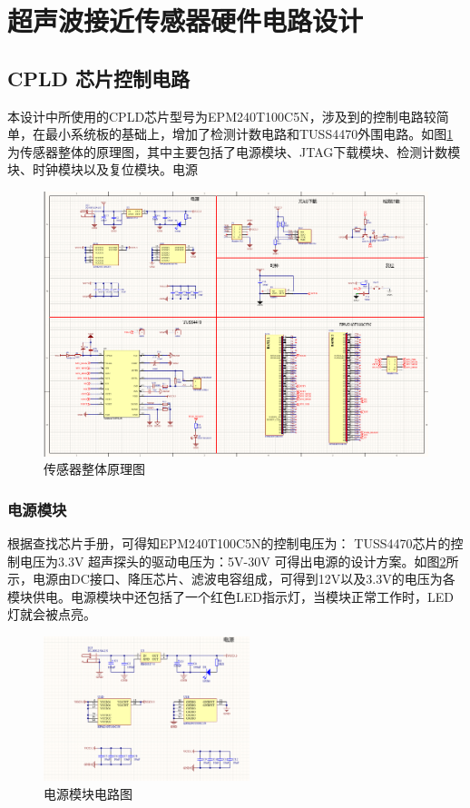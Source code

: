     \newpage
	\section{超声波接近传感器硬件电路设计}
	
    \subsection{CPLD 芯片控制电路}
    本设计中所使用的CPLD芯片型号为EPM240T100C5N，涉及到的控制电路较简单，在最小系统板的基础上，增加了检测计数电路和TUSS4470外围电路。如图\ref{传感器整体原理图}为传感器整体的原理图，其中主要包括了电源模块、JTAG下载模块、检测计数模块、时钟模块以及复位模块。电源
    \begin{figure}[ht]
        \centering
        \includegraphics[width=12cm]{figure/Overall circuit.png}
        \caption{传感器整体原理图}
        \label{传感器整体原理图}
    \end{figure}
    \subsubsection{电源模块}
      根据查找芯片手册，可得知EPM240T100C5N的控制电压为：
    TUSS4470芯片的控制电压为3.3V
    超声探头的驱动电压为：5V-30V
    可得出电源的设计方案。如图\ref{电源模块电路图}所示，电源由DC接口、降压芯片、滤波电容组成，可得到12V以及3.3V的电压为各模块供电。电源模块中还包括了一个红色LED指示灯，当模块正常工作时，LED灯就会被点亮。
    
         \begin{figure}[ht]
        \centering
        \includegraphics[width=6cm]{figure/Power circuit.png}
		\caption{电源模块电路图}
        \label{电源模块电路图}
    \end{figure}
    
